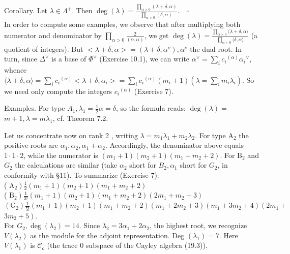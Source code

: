 \documentclass[10pt]{article}
\begin{document}
Corollary. Let $\lambda \in \Lambda^{+}$. Then $\operatorname{deg}(\lambda)=\frac{\prod_{\alpha>0}(\lambda+\delta, \alpha)}{\prod_{\alpha>0}(\delta, \alpha)} . \quad \square$\\
In order to compute some examples, we observe that after multiplying both numerator and denominator by $\prod_{\alpha>0} \frac{2}{(\alpha, \alpha)}$, we get $\operatorname{deg}(\lambda)=\frac{\prod_{\alpha \succ 0}\langle\lambda+\delta, \alpha\rangle}{\prod_{\alpha \succ 0}\langle\delta, \alpha\rangle}$ (a quotient of integers). But $<\lambda+\delta, \alpha>=\left(\lambda+\delta, \alpha^{\nu}\right), \alpha^{\nu}$ the dual root. In\\
turn, since $\Delta^{\vee}$ is a base of $\Phi^{\vee}$ (Exercise 10.1), we can write $\alpha^{\vee}=\sum_{i} c_{i}{ }^{(\alpha)} \alpha_{i}{ }^{\vee}$, whence $\langle\lambda+\delta, \alpha\rangle=\sum_{i} c_{i}{ }^{(\alpha)}<\lambda+\delta, \alpha_{i}>=\sum_{i} c_{i}{ }^{(\alpha)}\left(m_{i}+1\right)\left(\lambda=\sum_{i} m_{i} \lambda_{i}\right)$. So we need only compute the integers $c_{i}{ }^{(\alpha)}$ (Exercise 7).

Examples. For type $A_{1}, \lambda_{1}=\frac{1}{2} \alpha=\delta$, so the formula reads: $\operatorname{deg}(\lambda)=$ $m+1, \lambda=m \lambda_{1}$, cf. Theorem 7.2.

Let us concentrate now on rank 2 , writing $\lambda=m_{1} \lambda_{1}+m_{2} \lambda_{2}$. For type $\mathrm{A}_{2}$ the positive roots are $\alpha_{1}, \alpha_{2}, \alpha_{1}+\alpha_{2}$. Accordingly, the denominator above equals $1 \cdot 1 \cdot 2$, while the numerator is $\left(m_{1}+1\right)\left(m_{2}+1\right)\left(m_{1}+m_{2}+2\right)$. For $\mathrm{B}_{2}$ and $G_{2}$ the calculations are similar (take $\alpha_{2}$ short for $B_{2}, \alpha_{1}$ short for $G_{2}$, in conformity with §11). To summarize (Exercise 7):\\
( $\left.\mathrm{A}_{2}\right) \frac{1}{2}\left(m_{1}+1\right)\left(m_{2}+1\right)\left(m_{1}+m_{2}+2\right)$\\
( $\left.\mathrm{B}_{2}\right) \frac{1}{3!}\left(m_{1}+1\right)\left(m_{2}+1\right)\left(m_{1}+m_{2}+2\right)\left(2 m_{1}+m_{2}+3\right)$\\
$\left(\mathrm{G}_{2}\right) \frac{1}{5!}\left(m_{1}+1\right)\left(m_{2}+1\right)\left(m_{1}+m_{2}+2\right)\left(m_{1}+2 m_{2}+3\right)\left(m_{1}+3 m_{2}+4\right)\left(2 m_{1}+\right.$ $\left.3 m_{2}+5\right)$.\\
For $G_{2}, \operatorname{deg}\left(\lambda_{2}\right)=14$. Since $\lambda_{2}=3 \alpha_{1}+2 \alpha_{2}$, the highest root, we recognize $V\left(\lambda_{2}\right)$ as the module for the adjoint representation. Deg $\left(\lambda_{1}\right)=7$. Here $V\left(\lambda_{1}\right)$ is $\mathscr{C}_{o}$ (the trace 0 subspace of the Cayley algebra (19.3)).
\end{document}
